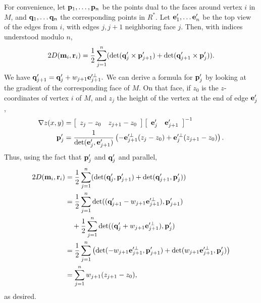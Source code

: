 \documentclass[annual]{acmsiggraph}
\begin{document}
For convenience, let ${\mathbf p}_1, \ldots, {\mathbf p}_n$ be the points dual to the faces around vertex $i$ in $M$, and ${\mathbf q}_1, \ldots {\mathbf q}_n$ the corresponding points in $R^{*}$. Let ${\mathbf e}'_1, \ldots {\mathbf e}'_n$ be the top view of the edges from $i$, with edges $j, j+1$ neighboring face $j$. Then, with indices understood modulo $n$,
\begin{equation*}
2D({\mathbf m}_i, {\mathbf r}_i) = \frac{1}{2}\sum_{j=1}^n (\det({\mathbf q}'_j \times {\mathbf p}'_{j+1}) + \det({\mathbf q}'_{j+1}\times {\mathbf p}'_j)).
\end{equation*}
We have ${\mathbf q}'_{j+1} = {\mathbf q}'_j + w_{j+1} {\mathbf e}'^{\perp}_{j+1}.$ We can derive a formula for ${\mathbf p}'_{j}$ by looking at the gradient of the corresponding face of $M$. On that face, if $z_0$ is the $z$-coordinates of vertex $i$ of $M$, and $z_j$ the height of the vertex at the end of edge ${\mathbf e}'_j$, 
\begin{align*}
\nabla z(x,y) &= \left[\begin{array}{cc} z_j - z_0 & z_{j+1} - z_0\end{array}\right] \left[\begin{array}{cc} {\mathbf e}'_{j} & {\mathbf e}'_{j+1}\end{array}\right]^{-1} \\
{\mathbf p}'_j &= \frac{1}{\det({\mathbf e}'_j, {\mathbf e}'_{j+1})} \left( -{\mathbf e}'^{\perp}_{j+1} (z_j - z_0) + {\mathbf e}'^{\perp}_j (z_{j+1}-z_0) \right).
\end{align*}
Thus, using the fact that ${\mathbf p}'_j$ and ${\mathbf q}'_j$ and parallel,
\begin{align*}
2D({\mathbf m}_i, {\mathbf r}_i) &= \frac{1}{2}\sum_{j=1}^n (\det({\mathbf q}'_j, {\mathbf p}'_{j+1}) + \det({\mathbf q}'_{j+1}, {\mathbf p}'_j))\\
&= \frac{1}{2}\sum_{j=1}^n \det(({\mathbf q}'_{j+1} - w_{j+1} {\mathbf e}'^{\perp}_{j+1}), {\mathbf p}'_{j+1}) \\
&\quad + \frac{1}{2}\sum_{j=1}^n \det(({\mathbf q}'_j + w_{j+1} {\mathbf e}'^{\perp}_{j+1}), {\mathbf p}'_j)\\
&= \frac{1}{2}\sum_{j=1}^n \left( \det(- w_{j+1} {\mathbf e}'^{\perp}_{j+1}, {\mathbf p}'_{j+1}) + \det(w_{j+1} {\mathbf e}'^{\perp}_{j+1}, {\mathbf p}'_j)\right) \\
&= \sum_{j=1}^n w_{j+1} (z_{j+1} -z_0),
\end{align*}
as desired.
\end{document}

